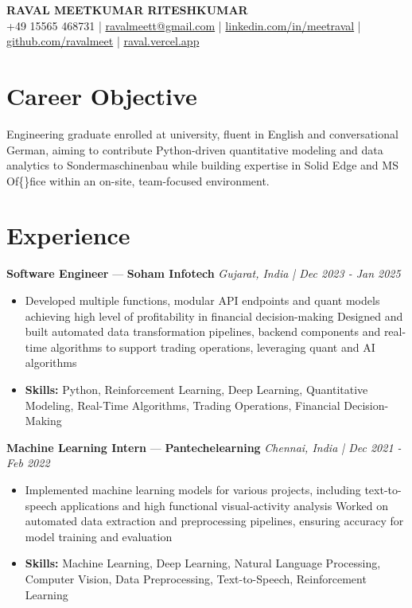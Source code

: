 \documentclass[a4paper,10pt]{article}
\begin{document}
\begin{center}
  {\Large\bfseries RAVAL MEETKUMAR RITESHKUMAR}\\[2pt]
  {\small +49 15565 468731 \;|\; \href{mailto:ravalmeett@gmail.com}{ravalmeett@gmail.com} \;|\; \href{https://www.linkedin.com/in/meetraval/}{linkedin.com/in/meetraval} \;|\; \href{https://github.com/ravalmeet}{github.com/ravalmeet} \;|\; \href{https://raval.vercel.app/}{raval.vercel.app}}
\end{center}
\vspace{-3pt}

\section*{Career Objective}
Engineering graduate enrolled at university, fluent in English and conversational German, aiming to contribute Python-driven quantitative modeling and data analytics to Sondermaschinenbau while building expertise in Solid Edge and MS Of\{\}fice within an on-site, team-focused environment.\par

\section*{Experience}
\textbf{Software Engineer} — \textbf{Soham Infotech} \hfill \textit{Gujarat, India \;|\; Dec 2023 - Jan 2025}\par
\vspace{1pt}
\begin{itemize}
  \item Developed multiple functions, modular API endpoints and quant models achieving high level of profitability in financial decision-making Designed and built automated data transformation pipelines, backend components and real-time algorithms to support trading operations, leveraging quant and AI algorithms
  \item \textbf{Skills:} Python, Reinforcement Learning, Deep Learning, Quantitative Modeling, Real-Time Algorithms, Trading Operations, Financial Decision-Making
\end{itemize}
\vspace{3pt}
\textbf{Machine Learning Intern} — \textbf{Pantechelearning} \hfill \textit{Chennai, India \;|\; Dec 2021 - Feb 2022}\par
\vspace{1pt}
\begin{itemize}
  \item Implemented machine learning models for various projects, including text-to-speech applications and high functional visual-activity analysis Worked on automated data extraction and preprocessing pipelines, ensuring accuracy for model training and evaluation
  \item \textbf{Skills:} Machine Learning, Deep Learning, Natural Language Processing, Computer Vision, Data Preprocessing, Text-to-Speech, Reinforcement Learning
\end{itemize}
\end{document}
